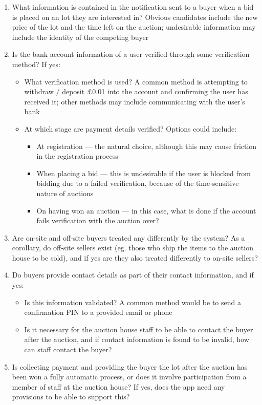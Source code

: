 \documentclass[titlepage, 12pt]{extarticle}
\begin{document}
\begin{enumerate}
\begin{itemize}
  \end{itemize}
\item What information is contained in the notification sent to a buyer when a bid is placed on an lot they are interested in? Obvious candidates include the new price of the lot and the time left on the auction; undesirable information may include the identity of the competing buyer
\item Is the bank account information of a user verified through some verification method? If yes:
  \begin{itemize}
  \item What verification method is used? A common method is attempting to withdraw / deposit \pounds 0.01 into the account and confirming the user has received it; other methods may include communicating with the user's bank
  \item At which stage are payment details verified? Options could include:
    \begin{itemize}
    \item At registration --- the natural choice, although this may cause friction in the registration process
    \item When placing a bid --- this is undesirable if the user is blocked from bidding due to a failed verification, because of the time-sensitive nature of auctions
    \item On having won an auction --- in this case, what is done if the account fails verification with the auction over?
    \end{itemize}
  \end{itemize}
\item Are on-site and off-site buyers treated any differently by the system? As a corollary, do off-site sellers exist (eg. those who ship the items to the auction house to be sold), and if yes are they also treated differently to on-site sellers?
\item Do buyers provide contact details as part of their contact information, and if yes:
  \begin{itemize}
  \item Is this information validated? A common method would be to send a confirmation PIN to a provided email or phone
  \item Is it necessary for the auction house staff to be able to contact the buyer after the auction, and if contact information is found to be invalid, how can staff contact the buyer?
  \end{itemize}
\item Is collecting payment and providing the buyer the lot after the auction has been won a fully automatic process, or does it involve participation from a member of staff at the auction house? If yes, does the app need any provisions to be able to support this?

\end{enumerate}
\end{document}
